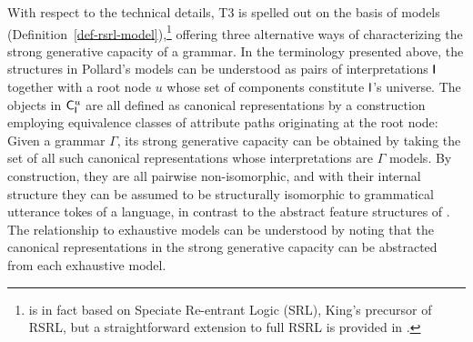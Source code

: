 \documentclass[output=paper
                ,modfonts
                ,nonflat
	        ,collection
	        ,collectionchapter
	        ,collectiontoclongg
 	        ,biblatex
                ,babelshorthands
                ,newtxmath
                ,draftmode
                ,colorlinks, citecolor=brown
]{./langsci/langscibook}
\begin{document}
{{With respect to the technical details, T3 is spelled out on the basis of
models (Definition~\ref{def-rsrl-model}),\footnote{\cite{Pollard99a} is in
  fact based on Speciate Re-entrant Logic (SRL),
  King's precursor of RSRL, but a straightforward extension to full
  RSRL is provided in \cite{Richter2004a-u}.} offering three
alternative ways of characterizing the strong generative capacity of a
grammar. In the terminology presented above, the structures in
Pollard's models can be understood as pairs of interpretations $\mathsf{I}$
together with a root node $u$ whose set of components constitute
$\mathsf{I}$'s universe. The objects in $\mathsf{C}_{\mathsf{I}}^u$ are all defined
as canonical representations by a construction employing equivalence
classes of attribute paths originating at the root node: Given a
grammar $\Gamma$, its strong generative capacity can be obtained by taking
the set of all such canonical representations whose interpretations are
$\Gamma$ models. By construction, they are all pairwise non-isomorphic,
and with their internal structure they can be assumed to be structurally
isomorphic to grammatical utterance tokes of a language, in contrast to
the abstract feature structures of \cite{PollardSag1994}. The relationship
to exhaustive models can be understood by noting that the canonical
representations in the strong generative capacity can be abstracted from
each exhaustive model.

}}
\end{document}
